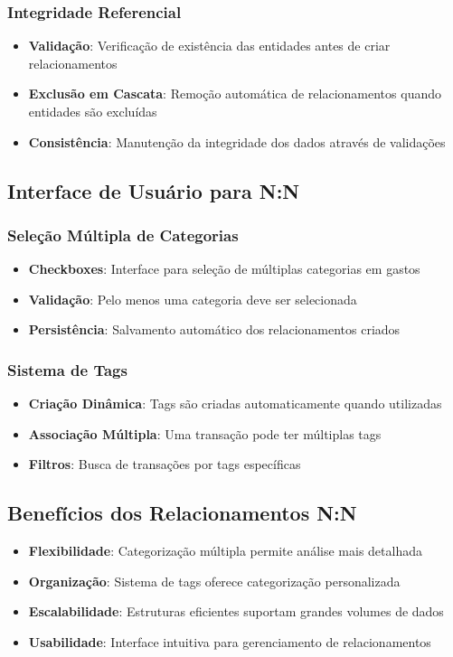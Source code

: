\documentclass[12pt,a4paper]{article}
\begin{document}
\subsubsection*{Integridade Referencial}
\begin{itemize}
  \item \textbf{Validação}: Verificação de existência das entidades antes de criar relacionamentos
  \item \textbf{Exclusão em Cascata}: Remoção automática de relacionamentos quando entidades são excluídas
  \item \textbf{Consistência}: Manutenção da integridade dos dados através de validações
\end{itemize}

\subsection{Interface de Usuário para N:N}

\subsubsection*{Seleção Múltipla de Categorias}
\begin{itemize}
  \item \textbf{Checkboxes}: Interface para seleção de múltiplas categorias em gastos
  \item \textbf{Validação}: Pelo menos uma categoria deve ser selecionada
  \item \textbf{Persistência}: Salvamento automático dos relacionamentos criados
\end{itemize}

\subsubsection*{Sistema de Tags}
\begin{itemize}
  \item \textbf{Criação Dinâmica}: Tags são criadas automaticamente quando utilizadas
  \item \textbf{Associação Múltipla}: Uma transação pode ter múltiplas tags
  \item \textbf{Filtros}: Busca de transações por tags específicas
\end{itemize}

\subsection{Benefícios dos Relacionamentos N:N}

\begin{itemize}
  \item \textbf{Flexibilidade}: Categorização múltipla permite análise mais detalhada
  \item \textbf{Organização}: Sistema de tags oferece categorização personalizada
  \item \textbf{Escalabilidade}: Estruturas eficientes suportam grandes volumes de dados
  \item \textbf{Usabilidade}: Interface intuitiva para gerenciamento de relacionamentos
\end{itemize}
\end{document}
